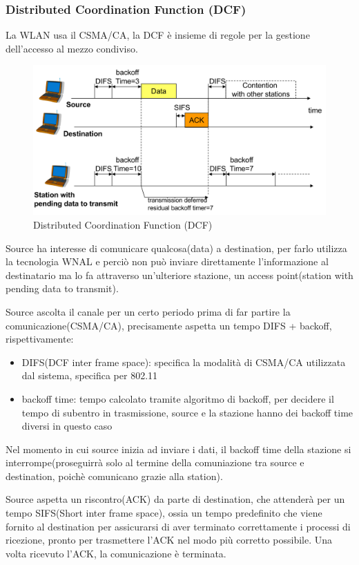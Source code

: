\subsubsection{Distributed Coordination Function (DCF)}
La WLAN usa il CSMA/CA, la DCF è insieme di regole per la gestione dell’accesso al
mezzo condiviso.

\begin{figure}[h!]
    \centering
    \includegraphics[scale=0.25]{images/dcf.png}
    \caption{Distributed Coordination Function (DCF)}
    \label{fig:dcf}
\end{figure}

Source ha interesse di comunicare qualcosa(data) a destination, per farlo utilizza la tecnologia WNAL e perciò non può inviare direttamente l'informazione al destinatario ma lo fa attraverso un'ulteriore stazione, un access point(station with pending data to transmit).

Source ascolta il canale per un certo periodo prima di far partire la comunicazione(CSMA/CA), precisamente aspetta un tempo DIFS + backoff, rispettivamente:
\begin{itemize}
    \item DIFS(DCF inter frame space): specifica la modalità di CSMA/CA utilizzata dal sistema, specifica per 802.11  
    \item backoff time: tempo calcolato tramite algoritmo di backoff, per decidere il tempo di subentro in trasmissione, source e la stazione hanno dei backoff time diversi in questo caso
\end{itemize}
Nel momento in cui source inizia ad inviare i dati, il backoff time della stazione si interrompe(proseguirrà solo al termine della comuniazione tra source e destination, poichè comunicano grazie alla station).

Source aspetta un riscontro(ACK) da parte di destination, che attenderà per un tempo SIFS(Short inter frame space), ossia un tempo predefinito che viene fornito al destination per assicurarsi di aver terminato correttamente i processi di ricezione, pronto per trasmettere l'ACK nel modo più corretto possibile. Una volta ricevuto l'ACK, la comunicazione è terminata.

